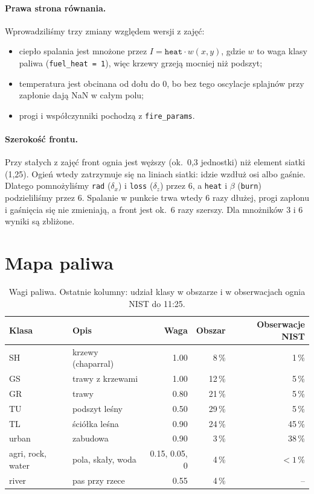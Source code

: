 \documentclass[11pt,a4paper]{article}
\begin{document}
\paragraph{Prawa strona równania.} Wprowadziliśmy trzy zmiany względem wersji z zajęć:
\begin{itemize}
\item ciepło spalania jest mnożone przez $I = \texttt{heat}\cdot w(x,y)$, gdzie $w$ to waga klasy
  paliwa (\texttt{fuel\_heat = 1}), więc krzewy grzeją mocniej niż podszyt;
\item temperatura jest obcinana od dołu do 0, bo bez tego oscylacje splajnów przy zapłonie
  dają NaN w całym polu;
\item progi i współczynniki pochodzą z \texttt{fire\_params}.
\end{itemize}


\paragraph{Szerokość frontu.} Przy stałych z zajęć front ognia jest węższy (ok.\ 0,3 jednostki)
niż element siatki (1,25). Ogień wtedy zatrzymuje się na liniach siatki: idzie wzdłuż osi albo
gaśnie. Dlatego pomnożyliśmy \texttt{rad} ($\delta_x$) i \texttt{loss} ($\delta_z$) przez 6,
a \texttt{heat} i $\beta$ (\texttt{burn}) podzieliliśmy przez 6. Spalanie w punkcie trwa
wtedy 6 razy dłużej, progi zapłonu i gaśnięcia się nie zmieniają, a front jest ok.\ 6 razy
szerszy. Dla mnożników 3 i 6 wyniki są zbliżone.

\section{Mapa paliwa}

\begin{table}[htbp]
\centering
\begin{tabular}{@{}llrrr@{}}
\toprule
Klasa & Opis & Waga & Obszar & Obserwacje NIST \\
\midrule
SH & krzewy (chaparral) & 1.00 & 8\,\% & 1\,\% \\
GS & trawy z krzewami & 1.00 & 12\,\% & 5\,\% \\
GR & trawy & 0.80 & 21\,\% & 5\,\% \\
TU & podszyt leśny & 0.50 & 29\,\% & 5\,\% \\
TL & ściółka leśna & 0.90 & 24\,\% & 45\,\% \\
urban & zabudowa & 0.90 & 3\,\% & 38\,\% \\
agri, rock, water & pola, skały, woda & 0.15, 0.05, 0 & 4\,\% & $<1$\,\% \\
river & pas przy rzece & 0.55 & 4\,\% & -- \\
\bottomrule
\end{tabular}
\caption{Wagi paliwa. Ostatnie kolumny: udział klasy w obszarze i w obserwacjach ognia NIST do 11:25.}
\end{table}
\end{document}
